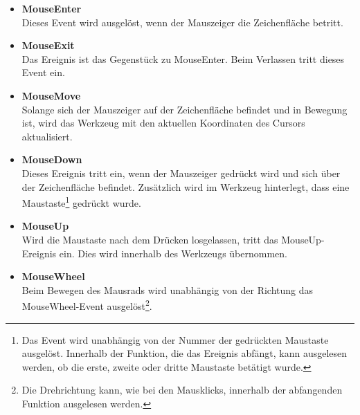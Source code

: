 \begin{itemize}
\item \textbf{MouseEnter} \\
	Dieses Event wird ausgelöst, wenn der Mauszeiger die Zeichenfläche betritt.
\item \textbf{MouseExit} \\
	Das Ereignis ist das Gegenstück zu MouseEnter. Beim Verlassen tritt dieses Event ein.
\item \textbf{MouseMove} \\
	Solange sich der Mauszeiger auf der Zeichenfläche befindet und in Bewegung ist, wird das Werkzeug mit den aktuellen Koordinaten des Cursors aktualisiert.
\item \textbf{MouseDown} \\
	Dieses Ereignis tritt ein, wenn der Mauszeiger gedrückt wird und sich über der Zeichenfläche befindet. Zusätzlich wird im Werkzeug hinterlegt, dass eine Maustaste\footnote{Das Event wird unabhängig von der Nummer der gedrückten Maustaste ausgelöst. Innerhalb der Funktion, die das Ereignis abfängt, kann ausgelesen werden, ob die erste, zweite oder dritte Maustaste betätigt wurde.} gedrückt wurde.
\item \textbf{MouseUp} \\
	Wird die Maustaste nach dem Drücken losgelassen, tritt das MouseUp-Ereignis ein. Dies wird innerhalb des Werkzeugs übernommen.
\item \textbf{MouseWheel} \\
	Beim Bewegen des Mausrads wird unabhängig von der Richtung das MouseWheel-Event ausgelöst\footnote{Die Drehrichtung kann, wie bei den Mausklicks, innerhalb der abfangenden Funktion ausgelesen werden.}.
\end{itemize}

